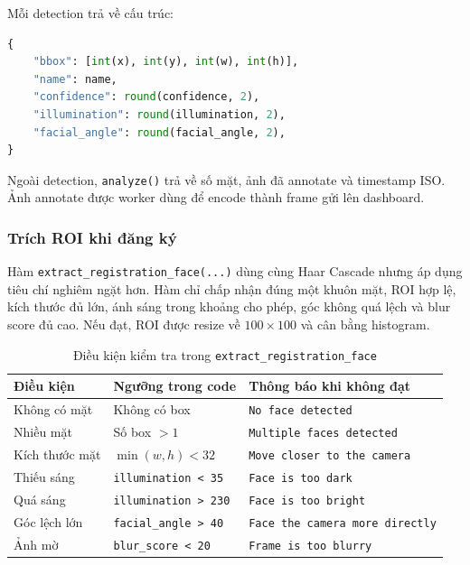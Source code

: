 Mỗi detection trả về cấu trúc:

\begin{lstlisting}[language=Python, caption={Detection object trả về từ FaceDetection}]
{
    "bbox": [int(x), int(y), int(w), int(h)],
    "name": name,
    "confidence": round(confidence, 2),
    "illumination": round(illumination, 2),
    "facial_angle": round(facial_angle, 2),
}
\end{lstlisting}

Ngoài detection, \texttt{analyze()} trả về số mặt, ảnh đã annotate và timestamp ISO. Ảnh annotate được worker dùng để encode thành frame gửi lên dashboard.

\subsubsection{Trích ROI khi đăng ký}

Hàm \texttt{extract\_registration\_face(...)} dùng cùng Haar Cascade nhưng áp dụng tiêu chí nghiêm ngặt hơn. Hàm chỉ chấp nhận đúng một khuôn mặt, ROI hợp lệ, kích thước đủ lớn, ánh sáng trong khoảng cho phép, góc không quá lệch và blur score đủ cao. Nếu đạt, ROI được resize về $100\times100$ và cân bằng histogram.

\begin{table}[H]
\centering
\caption{Điều kiện kiểm tra trong \texttt{extract\_registration\_face}}
\label{tab:extract_registration_checks}
\begin{tabularx}{\textwidth}{|l|l|X|}
\hline
\textbf{Điều kiện} & \textbf{Ngưỡng trong code} & \textbf{Thông báo khi không đạt} \\
\hline
Không có mặt & Không có box & \texttt{No face detected} \\
\hline
Nhiều mặt & Số box $> 1$ & \texttt{Multiple faces detected} \\
\hline
Kích thước mặt & $\min(w,h) < 32$ & \texttt{Move closer to the camera} \\
\hline
Thiếu sáng & \texttt{illumination < 35} & \texttt{Face is too dark} \\
\hline
Quá sáng & \texttt{illumination > 230} & \texttt{Face is too bright} \\
\hline
Góc lệch lớn & \texttt{facial\_angle > 40} & \texttt{Face the camera more directly} \\
\hline
Ảnh mờ & \texttt{blur\_score < 20} & \texttt{Frame is too blurry} \\
\hline
\end{tabularx}
\end{table}

